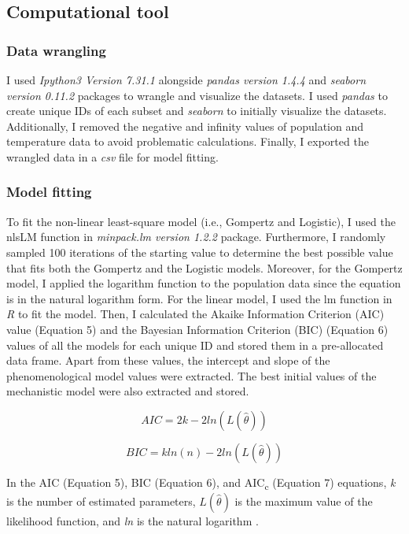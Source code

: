 \documentclass[11pt]{article}
\begin{document}
    \subsection*{Computational tool}
  \subsubsection*{Data wrangling}
  I used \textit{Ipython3 Version 7.31.1} alongside \textit{pandas version 1.4.4} and \textit{seaborn version 0.11.2} packages to wrangle and visualize the datasets.
  I used \textit{pandas} to create unique IDs of each subset and \textit{seaborn} to initially visualize the datasets.
  Additionally, I removed the negative and infinity values of population and temperature data to avoid problematic calculations.
  Finally, I exported the wrangled data in a \textit{csv} file for model fitting.
  
  \subsubsection*{Model fitting}
  To fit the non-linear least-square model (i.e., Gompertz and Logistic), I used the nlsLM function in \textit{minpack.lm version 1.2.2} package.
  Furthermore, I randomly sampled 100 iterations of the starting value to determine the best possible value that fits both the Gompertz and the Logistic models.
  Moreover, for the Gompertz model, I applied the logarithm function to the population data since the equation is in the natural logarithm form. 
  For the linear model, I used the lm function in \textit{R} to fit the model.
  Then, I calculated the Akaike Information Criterion (AIC) value (Equation 5) and the Bayesian Information Criterion (BIC) (Equation 6) values of all the models for each unique ID and stored them in a pre-allocated data frame.
  Apart from these values, the intercept and slope of the phenomenological model values were extracted. The best initial values of the mechanistic model were also extracted and stored.

  \begin{equation}
    AIC = 2k -2ln(L(\hat  \theta))
  \end{equation}

  \begin{equation}
    BIC = kln(n) - 2ln(L(\hat\theta))
  \end{equation}

  \noindent In the AIC (Equation 5), BIC (Equation 6), and AIC\textsubscript{c} (Equation 7) equations, \textit{k} is the number of estimated parameters, \begin{math} L(\hat \theta) \end{math} is the maximum value of the likelihood function, and \textit{ln} is the natural logarithm \cite{akaike1973information}.
\end{document}
